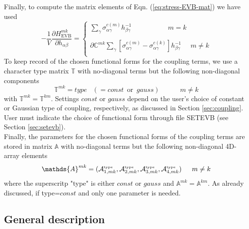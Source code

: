Finally, to compute the matrix elements of Eqn. (\ref{eq:stress-EVB-mat}) we have used
\begin{equation}\label{eq:grad-stress-comp}
-\frac{1}{V}\frac{\partial H^{mk}_{\text{EVB}}}{\partial h_{\alpha\beta}}=\begin{cases}
\sum_{\gamma}\sigma_{\alpha\gamma}^{c(m)}h^{-1}_{\beta\gamma} \,\,\,\,\,\,\,\,\,\,\,\,\,\,\,\,\,\,\,\,\,\,\,\,\,\,\,\,\,\,\,\,  m=k  \\
\\
\partial\mathds{C}^{mk}\sum_{\gamma}[\sigma_{\alpha\gamma}^{c(m)}-\sigma_{\alpha\gamma}^{c(k)}] h^{-1}_{\beta\gamma}  \,\,\,\,\,\,\,\,   m \ne k \\
\end{cases} 
\end{equation}    
To keep record of the chosen functional forms for the coupling terms, we use a character type matrix $\mathds{T}$ with no-diagonal terms but the following non-diagonal components 
\begin{equation}\label{eq:coulp-type}
\mathds{T}^{mk}= type \,\,\,\,\, (= const\,\,\,\text{or}\,\,\,gauss)  \,\,\,\,\,\,\,\,\,\,\,\,\,\,\,\,\,\,   m \ne k
\end{equation}
with $\mathds{T}^{mk}=\mathds{T}^{km}$. Settings $const$ or $gauss$ depend on the user's choice of constant or Gaussian type of coupling, respectively, as discussed in Section \ref{sec:coupling}. User must indicate the choice of functional form through file SETEVB (see Section \ref{sec:setevb}). \\  
Finally, the parameters for the chosen functional forms of the coupling terms are stored in matrix $\mathds{A}$ with no-diagonal terms but the following non-diagonal 4D-array elements  
\begin{equation}\label{eq:coulp-param}
\mathds{A}^{mk}=  (\mathcal{A}^{\text{\tiny{type}}}_{1,mk},\mathcal{A}^{\text{\tiny{type}}}_{2,mk},\mathcal{A}^{\text{\tiny{type}}}_{3,mk},\mathcal{A}^{\text{\tiny{type}}}_{4,mk}) \,\,\,\,\,\,\,\,\,   m \ne k
\end{equation}
where the superscritp "type" is either $const$ or $gauss$ and $\mathds{A}^{mk}=\mathds{A}^{km}$. As already discussed, if type=$const$ and only one parameter is needed.

\subsection{General description}


